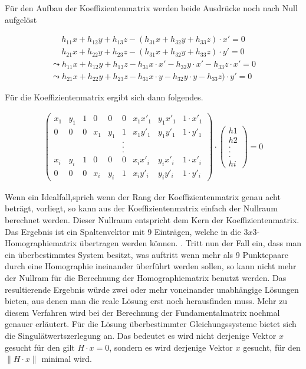 Für den Aufbau der Koeffizientenmatrix werden beide Ausdrücke noch nach Null aufgelöst

\begin{gather}
	h_{11}x+h_{12}y+h_{13}z -(h_{31}x+h_{32}y+h_{33}z) \cdot x'= 0 \\	h_{21}x+h_{22}y+h_{23}z-(h_{31}x+h_{32}y+h_{33}z) \cdot y'=0
	\end{gather}
\begin{gather}
	\leadsto h_{11}x+h_{12}y+h_{13}z -h_{31}x\cdot x' - h_{32}y \cdot x'-h_{33}z\cdot x'= 0\\
	\leadsto h_{21}x+h_{22}y+h_{23}z-h_{31}x\cdot y -h_{32}y \cdot y -h_{33}z) \cdot y'=0
\end{gather}

Für die Koeffizientenmatrix ergibt sich dann folgendes.

\begin{gather}
	\begin{pmatrix}
	x_1&y_1&1&0&0&0&x_1 x'_1&y_1 x'_1 & 1\cdot x'_1\\
	0&0&0&x_1&y_1&1&x_1 y'_1&y_1 y'_1 & 1\cdot y'_1\\
	&&&&&.&&&\\	
	&&&&&.&&&\\	
	&&&&&.&&&\\	
	x_i&y_i&1&0&0&0&x_i x'_i&y_i x'_i & 1\cdot x'_i\\
	0&0&0&x_i&y_i&1&x_i y'_i&y_i y'_i & 1\cdot y'_i
	\end{pmatrix}
	\cdot
	\begin{pmatrix}
	h1\\h2\\.\\.\\.\\hi
	\end{pmatrix}
	=0
\end{gather}

Wenn ein Idealfall,sprich wenn der Rang der Koeffizientenmatrix genau acht beträgt, vorliegt, so kann aus der Koeffizientenmatrix einfach der Nullraum berechnet werden. Dieser Nullraum entspricht dem Kern der Koeffizientenmatrix. Das Ergebnis ist ein Spaltenvektor mit 9 Einträgen, welche in die \ensuremath{3x3}-Homographiematrix übertragen werden können. \cite{HZ}\cite{Schwarz}. Tritt nun der Fall ein, dass man ein überbestimmtes System besitzt, was auftritt wenn mehr als 9 Punktepaare durch eine Homographie ineinander überführt werden sollen, so kann nicht mehr der Nullram für die Berechnung der Homographiematrix benutzt werden. Das resultierende Ergebnis würde zwei oder mehr voneinander unabhängige Lösungen bieten, aus denen man die reale Lösung erst noch herausfinden muss. Mehr zu diesem Verfahren wird bei der Berechnung der Fundamentalmatrix nochmal genauer erläutert.\cite{HZ} Für die Lösung überbestimmter Gleichungssysteme bietet sich die Singulätwertszerlegung an\cite{HZ}\cite{Scholz}. Das bedeutet es wird nicht derjenige Vektor $x$ gesucht für den gilt $H \cdot x = 0$, sondern es wird derjenige Vektor $x$ gesucht, für den \ensuremath{\parallel H \cdot x\parallel} minimal wird.\cite{HZ}

